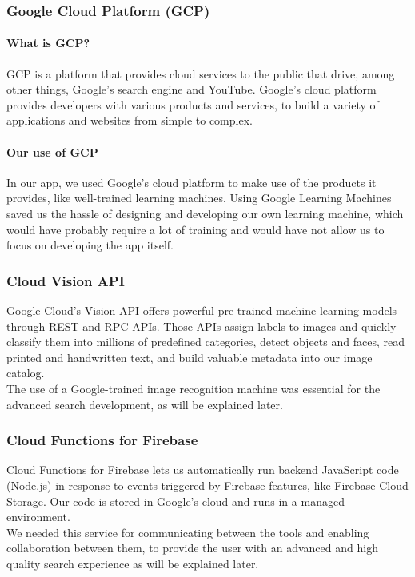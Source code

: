 \documentclass{article}
\begin{document}
\subsubsection{Google Cloud Platform (GCP)}
\paragraph{What is GCP?}
GCP is a platform that provides cloud services to the public that drive, among other things, Google's search engine and YouTube. Google's cloud platform provides developers with various products and services, to build a variety of applications and websites from simple to complex.
\paragraph{Our use of GCP}
In our app, we used Google's cloud platform to make use of the products it provides, like well-trained learning machines. Using Google Learning Machines saved us the hassle of designing and developing our own learning machine, which would have probably require a lot of training and would have not allow us to focus on developing the app itself.
\subsubsection{Cloud Vision API}
Google Cloud's Vision API offers powerful pre-trained machine learning models through REST and RPC APIs. Those APIs assign labels to images and quickly classify them into millions of predefined categories, detect objects and faces, read printed and handwritten text, and build valuable metadata into our image catalog.\\
The use of a Google-trained image recognition machine was essential for the advanced search development, as will be explained later.
\subsubsection{Cloud Functions for Firebase}
Cloud Functions for Firebase lets us automatically run backend JavaScript code (Node.js) in response to events triggered by Firebase features, like Firebase Cloud Storage. Our code is stored in Google's cloud and runs in a managed environment.\\
We needed this service for communicating between the tools and enabling collaboration between them, to provide the user with an advanced and high quality search experience as will be explained later.
\end{document}
